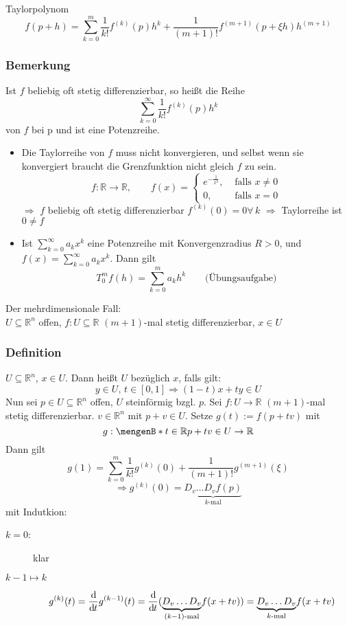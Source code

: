Taylorpolynom
\[
	f(p+h)=\sum_{k=0}^{m}\frac{1}{k!}f^{(k)}(p)h^k + \frac{1}{(m+1)!}f^{(m+1)}(p+ \xi h)h^{(m+1)}
\]
\subsubsection{Bemerkung} %
\label{ssub:bemerkung}
Ist $f$ beliebig oft stetig differenzierbar, so heißt die Reihe
\[
	\sum^{\infty}_{k=0}\frac{1}{k!}f^{(k)}(p)h^k
\]
 von $f$ bei p und ist eine Potenzreihe.
\begin{itemize}
	\item Die Taylorreihe von $f$ muss nicht konvergieren, und selbst wenn sie konvergiert braucht die Grenzfunktion nicht gleich $f$ zu sein.
	\[
		f:\mathbb{R}\to \mathbb{R}, \qquad f(x) = \begin{cases}
			e^{-\frac{1}{x^2}}, &\text{ falls }x \neq 0\\ 0, &\text{ falls }x=0 \end{cases}
	\] 
	$\Rightarrow $ $f$ beliebig oft stetig differenzierbar $f^{(k)}(0)=0 \forall\, k$
	$\Rightarrow $ Taylorreihe ist $0 \neq f$
	\item Ist $\sum_{k=0}^{\infty}a_kx^k$ eine Potenzreihe mit Konvergenzradius $R>0$, und $f(x)= \sum_{k=0}^{\infty}a_kx^k$. Dann gilt
	\[
		T_0^mf(h)=\sum_{k=0}^{m}a_kh^k \qquad \text{(Übungsaufgabe)}
	\]
\end{itemize}
Der mehrdimensionale Fall: \\
$ U \subseteq \mathbb{R}^n$ offen, $f:U \subseteq \mathbb{R}$ $(m+1)$-mal stetig differenzierbar, $x \in U$
\subsubsection{Definition} %
\label{ssub:definition}
$U \subseteq \mathbb{R}^n$, $x \in U$. Dann heißt $U$ bezüglich $x$, falls gilt:
\[
	y \in U,\,t \in [0,1] \Rightarrow (1-t)x+ty \in U
\]
Nun sei $p \in U \subseteq \mathbb{R}^n$ offen, $U$ steinförmig bzgl. $p$. Sei $f: U \to \mathbb{R}$ $(m+1)$-mal stetig differenzierbar. $v \in \mathbb{R}^n$ mit $p+v \in U$. Setze $g(t):=f(p+tv)$ mit
\[
	g: \set[t \in \mathbb{R}]{p+tv \in U} \to \mathbb{R}
\]
Dann gilt
\[
	g(1)= \sum_{k=0}^{m}\frac{1}{k!}g^{(k)}(0)+ \frac{1}{(m+1)!}g^{(m+1)}(\xi)
\]
\[
	\Rightarrow g^{(k)}(0)=\underset{k \text{-mal}}{\underbrace{D_v \dots D_vf(p)}}
\]
mit Indutkion:
\begin{description}
	\item[$k=0$:] klar
	\item[$k-1 \mapsto k$] 
	\[
		g^{(k)}(t)=\frac{\mathrm{d}\mkern-1.0mu }{\mathrm{d}\mkern-1.0mu t} g^{(k-1)}(t)= \frac{\mathrm{d}\mkern-1.0mu }{\mathrm{d}\mkern-1.0mu t} (\underset{(k-1) \text{-mal}}{\underbrace{D_v \dots D_v}} f(x+tv))
		= \underset{k \text{-mal}}{\underbrace{D_v \dots D_v}} f(x+tv)
	\] 
\end{description}
